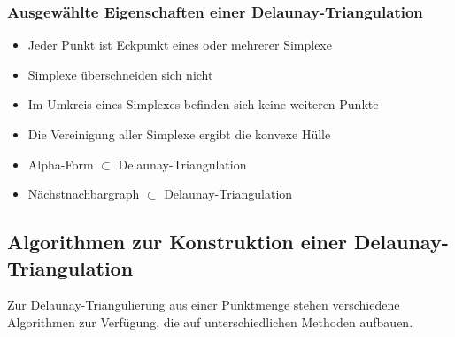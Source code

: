 \subsubsection{Ausgewählte Eigenschaften einer Delaunay-Triangulation}

\begin{itemize}
\item Jeder Punkt ist Eckpunkt eines oder mehrerer Simplexe
\item Simplexe überschneiden sich nicht
\item Im Umkreis eines Simplexes befinden sich keine weiteren Punkte
\item Die Vereinigung aller Simplexe ergibt die konvexe Hülle
\item Alpha-Form $\subset$ Delaunay-Triangulation
\item %
  Nächstnachbargraph $\subset$ Delaunay-Triangulation
\end{itemize}

\subsection{Algorithmen zur Konstruktion einer Delaunay-Triangulation}


Zur Delaunay-Triangulierung aus einer Punktmenge stehen verschiedene Algorithmen zur Verfügung, die auf unterschiedlichen Methoden aufbauen.

